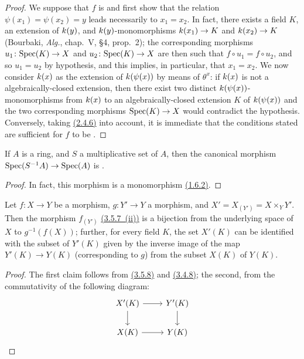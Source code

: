 \begin{proof}
\label{proof-prop-1.3.5.8}
We suppose that $f$ is  and first show that the relation $\psi(x_1)=\psi(x_2)=y$ leads necessarily to $x_1=x_2$.
In fact, there exists a field $K$, an extension of $k(y)$, and $k(y)$-monomorphisms $k(x_1)\to K$ and $k(x_2)\to K$ (Bourbaki, \emph{Alg.}, chap.~V, §4, prop.~2); the corresponding morphisms $u_1\colon{\mathop{\mathrm{Spec}}\nolimits}(K)\to X$ and $u_2\colon{\mathop{\mathrm{Spec}}\nolimits}(K)\to X$ are then such that $f\circ u_1=f\circ u_2$, and so $u_1=u_2$ by hypothesis, and this implies, in particular, that $x_1=x_2$.
We now consider $k(x)$ as the extension of $k(\psi(x))$ by means of $\theta^x$: if $k(x)$ is not a  algebraically-closed extension, then there exist two distinct $k(\psi(x))$-monomorphisms from $k(x)$ to an algebraically-closed extension $K$ of $k(\psi(x))$ and the two corresponding morphisms ${\mathop{\mathrm{Spec}}\nolimits}(K)\to X$ would contradict the hypothesis.
Conversely, taking \hyperref[cor-1.2.4.6]{(2.4.6)} into account, it is immediate that the conditions stated are sufficient for $f$ to be .
\end{proof}

\begin{cor}[3.5.9]
\label{cor-1.3.5.9}
If $A$ is a ring, and $S$ a multiplicative set of $A$, then the canonical morphism ${\mathop{\mathrm{Spec}}\nolimits}(S^{-1}A)\to{\mathop{\mathrm{Spec}}\nolimits}(A)$ is .
\end{cor}

\begin{proof}
\label{proof-cor-1.3.5.9}
In fact, this morphism is a monomorphism \hyperref[exm-1.1.6.2]{(1.6.2)}.
\end{proof}

\begin{cor}[3.5.10]
\label{cor-1.3.5.10}
Let $f\colon X\to Y$ be a  morphism, $g\colon Y'\to Y$ a morphism, and $X'=X_{(Y')}=X\times_Y Y'$.
Then the  morphism $f_{(Y')}$ \hyperref[prop-1.3.5.7]{(3.5.7~(ii))} is a bijection from the underlying space of $X$ to $g^{-1}(f(X))$; further, for every field $K$, the set $X'(K)$ can be identified with the subset of $Y'(K)$ given by the inverse image of the map $Y'(K)\to Y(K)$ (corresponding to $g$) from the subset $X(K)$ of $Y(K)$.
\end{cor}

\begin{proof}
\label{proof-cor-1.3.5.10}
The first claim follows from \hyperref[prop-1.3.5.8]{(3.5.8)} and \hyperref[cor-1.3.4.8]{(3.4.8)}; the second, from the commutativity of the following diagram:
\begin{equation*}
    \begin{tikzcd}
        X'(K) \ar[r] \ar[d]
        & Y'(K) \ar[d]\\
        X(K) \ar[r]
        & Y(K)
    \end{tikzcd}
\end{equation*}
\end{proof}

